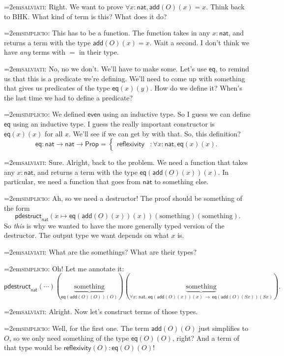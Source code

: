 \documentclass[11pt,paper=letter]{scrartcl}
\renewcommand{\sf}{\mathsf}
\newcommand{\simp}{\vspace{0.5em}\noindent\hangindent=2em\textsc{simplicio:} }
\newcommand{\salv}{\vspace{0.5em}\noindent\hangindent=2em\textsc{salviati:} }
\newcommand{\prop}{\mathsf{Prop}}
\newcommand{\sto}{\,\to\,}
\begin{document}
\salv Right. We want to prove $\forall x: \sf{nat}, \sf{add}(O)(x) = x$. Think back to BHK. What kind of term is this? What does it do?

\simp This has to be a function. The function takes in any $x : \sf{nat}$, and returns a term with the type $\sf{add}(O)(x) = x$. Wait a second. I don't think we have \emph{any} terms with $=$ in their type.

\salv No, no we don't. We'll have to make some. Let's use $\sf{eq}$, to remind us that this is a predicate we're defining. We'll need to come up with something that gives us predicates of the type $\sf{eq}(x)(y)$. How do we define it? When's the last time we had to define a predicate?

\simp We defined $\sf{even}$ using an inductive type. So I guess we can define $\sf{eq}$ using an inductive type. I guess the really important constructor is $\sf{eq}(x)(x)$ for all $x$. We'll see if we can get by with that. So, this definition? \[
\sf{eq}: \sf{nat} \to \sf{nat} \to \prop =
  \begin{cases}
  \sf{reflexivity}&: \forall x: \sf{nat}, \sf{eq}(x)(x).
  \end{cases}
\]

\salv Sure. Alright, back to the problem. We need a function that takes any $x : \sf{nat}$, and returns a term with the type $\sf{eq}(\sf{add}(O)(x))(x)$. In particular, we need a function that goes from $\sf{nat}$ to something else.

\simp Ah, so we need a destructor! The proof should be something of the form \[
  \sf{pdestruct}_\sf{nat}(x \mapsto \sf{eq}(\sf{add}(O)(x))(x))
  (\text{something})(\text{something}).
\]
So \emph{this} is why we wanted to have the more generally typed version of the destructor. The output type we want depends on what $x$ is.

\salv What are the somethings? What are their types?

\simp Oh! Let me annotate it: \[
  \sf{pdestruct}_\sf{nat}
  (\cdots)
  (\underbrace{\text{something}}_{\sf{eq}(\sf{add}(O)(O))(O)})
  (\underbrace{\text{something}}_{\forall x:\,\sf{nat},\,\sf{eq}(\sf{add}(O)(x))(x)\sto\sf{eq}(\sf{add}(O)(Sx))(Sx)}).
\]

\salv Alright. Now let's construct terms of those types.

\simp Well, for the first one. The term $\sf{add}(O)(O)$ just simplifies to $O$, so we only need something of the type $\sf{eq}(O)(O)$, right? And a term of that type would be $\sf{reflexivity}(O) : \sf{eq}(O)(O)$!
\end{document}
